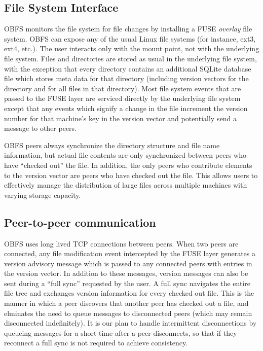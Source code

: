\documentclass[10pt,twocolumn]{article}
\begin{document}
\subsection{File System Interface}
OBFS monitors the file system for file changes by installing a FUSE 
\emph{overlay} file system. OBFS can expose any of the usual Linux file systems
(for instance, ext3, ext4, etc.). The user interacts only with the mount point,
not with the underlying file system. Files and directories are stored as usual
in the underlying file system, with the exception that every directory contains
an additional SQLite database file which stores meta data for that directory
(including version vectors for the directory and for all files in that 
directory). Most file system events that are passed to the FUSE layer are
serviced directly by the underlying file system except that any events which
signify a change in the file increment the version number for that machine's
key in the version vector and potentially send a message to other peers. 

OBFS peers always synchronize the directory structure and file name information, but actual file contents are only synchronized between peers who have
``checked out'' the file. In addition, the only peers who contribute elements 
to the version vector are peers who have checked out the file. This allows
users to effectively manage the distribution of large files across multiple 
machines with varying storage capacity. 

\subsection{Peer-to-peer communication}
OBFS uses long lived TCP connections between peers. When two peers are connected,
any file modification event intercepted by the FUSE layer generates a version
advisory message which is passed to any connected peers with entries in the 
version vector. In addition to these messages, version messages can also be
sent during a ``full sync'' requested by the user. A full sync navigates the
entire file tree and exchanges version information for every checked out file. 
This is the manner in which a peer discovers that another peer has checked out
a file, and elminates the need to queue messages to disconnected peers 
(which may remain disconnected indefinitely). It is our plan to handle
intermittent disconnections by queueing messages for a short time after a 
peer disconnects, so that if they reconnect a full sync is not required to
achieve consistency. 
\end{document}
